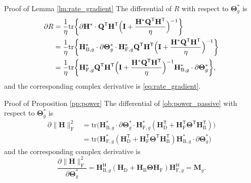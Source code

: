 \documentclass[journal]{IEEEtran}
\begin{document}
\begin{appendix}
	\begin{subsection}{Proof of Lemma \ref{lm:rate_gradient}}\label{ap:rate_gradient}
		The differential of $R$ with respect to $\mathbf{\Theta}_g^*$ is \cite{Hjorungnes2007}
		\begin{align*}
			\partial R
			 & = \frac{1}{\eta} \mathrm{tr} \biggl\{ \partial \mathbf{H}^* \cdot \mathbf{Q}^\mathsf{T} \mathbf{H}^\mathsf{T} \Bigl(\mathbf{I} + \frac{\mathbf{H}^* \mathbf{Q}^\mathsf{T} \mathbf{H}^\mathsf{T}}{\eta}\Bigr)^{-1} \biggr\}                                                                      \\
			 & = \frac{1}{\eta} \mathrm{tr} \biggl\{ \mathbf{H}_{\mathrm{B},g}^* \cdot \partial \mathbf{\Theta}_g^* \cdot \mathbf{H}_{\mathrm{F},g}^* \mathbf{Q}^\mathsf{T} \mathbf{H}^\mathsf{T} \Bigl(\mathbf{I} + \frac{\mathbf{H}^* \mathbf{Q}^\mathsf{T} \mathbf{H}^\mathsf{T}}{\eta}\Bigr)^{-1} \biggr\} \\
			 & = \frac{1}{\eta} \mathrm{tr} \biggl\{ \mathbf{H}_{\mathrm{F},g}^* \mathbf{Q}^\mathsf{T} \mathbf{H}^\mathsf{T} \Bigl(\mathbf{I} + \frac{\mathbf{H}^* \mathbf{Q}^\mathsf{T} \mathbf{H}^\mathsf{T}}{\eta}\Bigr)^{-1} \mathbf{H}_{\mathrm{B},g}^* \cdot \partial \mathbf{\Theta}_g^* \biggr\},
		\end{align*}
		and the corresponding complex derivative is \eqref{eq:rate_gradient}.
	\end{subsection}

	\begin{subsection}{Proof of Proposition \ref{pp:power}}\label{ap:power}
		The differential of \eqref{ob:power_passive} with respect to $\mathbf{\Theta}_g^*$ is
		\begin{align*}
			\partial \lVert \mathbf{H} \rVert _\mathrm{F}^2
			 & = \mathrm{tr}\bigl(\mathbf{H}_{\mathrm{B},g}^* \cdot \partial \mathbf{\Theta}_g^* \cdot \mathbf{H}_{\mathrm{F},g}^* (\mathbf{H}_\mathrm{D}^\mathsf{T} + \mathbf{H}_\mathrm{F}^\mathsf{T} \mathbf{\Theta}^\mathsf{T} \mathbf{H}_\mathrm{B}^\mathsf{T})\bigr) \\
			 & = \mathrm{tr}\bigl(\mathbf{H}_{\mathrm{F},g}^* (\mathbf{H}_\mathrm{D}^\mathsf{T} + \mathbf{H}_\mathrm{F}^\mathsf{T} \mathbf{\Theta}^\mathsf{T} \mathbf{H}_\mathrm{B}^\mathsf{T}) \mathbf{H}_{\mathrm{B},g}^* \cdot \partial \mathbf{\Theta}_g^*\bigr)
		\end{align*}
		and the corresponding complex derivative is
		\begin{equation}
			\frac{\partial \lVert \mathbf{H} \rVert _\mathrm{F}^2}{\partial \mathbf{\Theta}_g^*} = \mathbf{H}_{\mathrm{B},g}^\mathsf{H} (\mathbf{H}_\mathrm{D} + \mathbf{H}_\mathrm{B} \mathbf{\Theta} \mathbf{H}_\mathrm{F}) \mathbf{H}_{\mathrm{F},g}^\mathsf{H} = \mathbf{M}_g.
		\end{equation}


\end{subsection}
\end{appendix}
\end{document}
